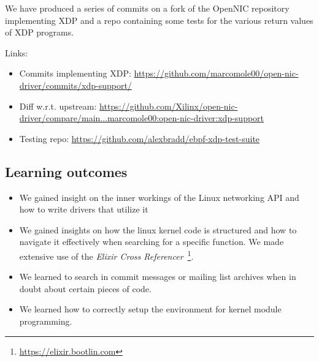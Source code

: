\documentclass[10pt,a4]{article}
\begin{document}
We have produced a series of commits on a fork of the OpenNIC repository
implementing XDP and a repo containing some tests for the various return
values of XDP programs.

Links:

\begin{itemize}
  \item Commits implementing XDP: \url{https://github.com/marcomole00/open-nic-driver/commits/xdp-support/}
  \item Diff w.r.t. upstream: \url{https://github.com/Xilinx/open-nic-driver/compare/main...marcomole00:open-nic-driver:xdp-support}
  \item Testing repo: \url{https://github.com/alexbradd/ebpf-xdp-test-suite}
\end{itemize}

\subsection{Learning outcomes}
\begin{itemize}
\item We gained insight on the inner workings of the Linux networking API and
  how to write drivers that utilize it
\item We gained insights on how the linux kernel code is structured and how to
  navigate it effectively when searching for a specific function. We made
  extensive use of the \textit{Elixir Cross Referencer}~\footnote{\url{https://elixir.bootlin.com}}.
\item We learned to search in commit messages or mailing list archives when in
  doubt about certain pieces of code.
\item We learned how to correctly setup the environment for kernel module programming.
\end{itemize}



\end{document}
